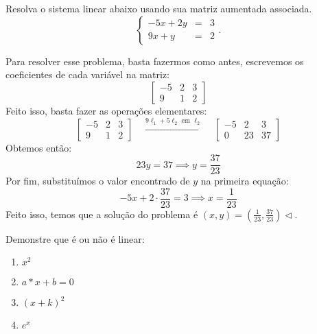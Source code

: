 \begin{exeresol}
Resolva o sistema linear abaixo usando sua matriz aumentada associada.
\begin{equation}
  \left\{
    \begin{array}{rcl}
      -5x+2y&=&3 \\
      9x+y&=&2
    \end{array}
  \right..
\end{equation}
\end{exeresol}
\begin{resol}
Para resolver esse problema, basta fazermos como antes, escrevemos os coeficientes de cada variável na matriz:
\begin{equation}
 \left[
  \begin{array}{cc|c}
    -5 &  2 & 3 \\
    9 & 1 & 2
  \end{array}
\right]
\end{equation}
Feito isso, basta fazer as operações elementares:
\begin{equation}
 \left[
  \begin{array}{cc|c}
    -5 &  2 & 3 \\
    9 & 1 & 2
  \end{array}
\right]
\quad \xrightarrow{9\ell_1 + 5\ell_2 \text{ em } \ell_2} \quad
 \left[
  \begin{array}{cc|c}
    -5 &  2 & 3 \\
    0 & 23 & 37
  \end{array}
\right]
\end{equation}
Obtemos então:
\begin{equation}
23y = 37 \implies y = \frac{37}{23}
\end{equation}
Por fim, substituímos o valor encontrado de $y$ na primeira equação:
\begin{equation}
 -5x + 2\cdot \frac{37}{23} = 3 \implies x = \frac{1}{23}
\end{equation}
Feito isso, temos que a solução do problema é $(x,y) = (\frac{1}{23}, \frac{37}{23}) \lhd$.
\end{resol}
\begin{exeresol}
        Demonstre que é ou não é linear:
        \justify
            \begin{enumerate}
                \item $x^{2}$
                \item $a*x + b = 0$
                \item $(x + k)^{2}$
                \item $e^{x}$
            \end{enumerate}
\end{exeresol}
